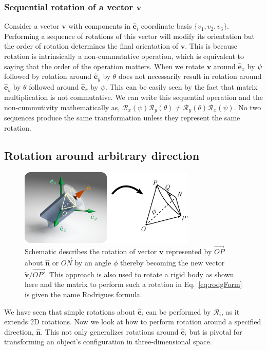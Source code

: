 \documentclass{article}
\def\nh{\hat{\mathbf{n}}}
\def\eh{\hat{\mathbf{e}}}
\def\v{\mathbf{v}}
\def\vt{\tilde{\mathbf{v}}}
\def\R{\mathcal{R}}
\def\nh{\hat{\mathbf{n}}}
\begin{document}
\subsubsection*{Sequential rotation of a vector \texorpdfstring{$\v$}{v}}
Consider a vector $\v$ with components in $\eh_i$ coordinate basis $\{ v_1, v_2, v_3 \}$. Performing a sequence of rotations of this vector will modify its orientation but the order of rotation determines the final orientation of $\v$. This is because rotation is intrinsically a non-cummutative operation, which is equivalent to saying that the order of the operation matters. When we rotate $\v$ around $\eh_x$ by $\psi$ followed by rotation around $\eh_y$ by $\theta$ does not necessarily result in rotation around $\eh_y$ by $\theta$ followed around $\eh_x$ by $\psi$. This can be easily seen by the fact that matrix multiplication is not commutative. We can write this sequential operation and the non-cummutivity mathematically as, $\R_x(\psi) \R_y(\theta) \neq \R_y(\theta) \R_x(\psi)$. No two sequences produce the same transformation unless they represent the same rotation.

\subsection{Rotation around arbitrary direction}\label{sec:rodg}
\begin{figure}[t!]
  \centering
  \includegraphics[width=0.75\textwidth]{figs/figRodg.png}
  \caption{Schematic describes the rotation of vector $\v$ represented by $\vec{OP}$ about $\nh$ or $\vec{ON}$ by an angle $\phi$ thereby becoming the new vector $\vt / \vec{OP'}$. This approach is also used to rotate a rigid body as shown here and the matrix to perform such a rotation in Eq.~\ref{eq:rodgForm} is given the name Rodrigues formula.}
  \label{fig:rodg}
\end{figure}
We have seen that simple rotations about $\eh_i$ can be performed by $\R_i$, as it extends 2D rotations. Now we look at how to perform rotation around a specified direction, $\nh$. This not only generalizes rotations around $\eh_i$ but is pivotal for transforming an object's configuration in three-dimensional space.
\end{document}
